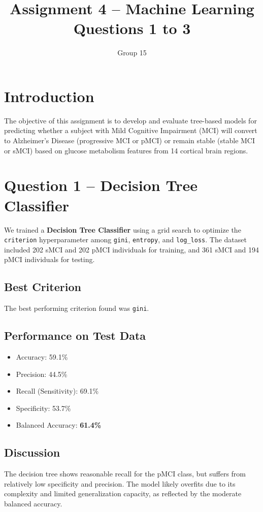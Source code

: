 \documentclass[12pt]{article}
\title{Assignment 4 – Machine Learning \\ \large Questions 1 to 3}
\author{Group 15}
\date{}
\begin{document}
\maketitle

\section*{Introduction}

The objective of this assignment is to develop and evaluate tree-based models for predicting whether a subject with Mild Cognitive Impairment (MCI) will convert to Alzheimer’s Disease (progressive MCI or pMCI) or remain stable (stable MCI or sMCI) based on glucose metabolism features from 14 cortical brain regions.

\section*{Question 1 – Decision Tree Classifier}

We trained a \textbf{Decision Tree Classifier} using a grid search to optimize the \texttt{criterion} hyperparameter among \texttt{gini}, \texttt{entropy}, and \texttt{log\_loss}. The dataset included 202 sMCI and 202 pMCI individuals for training, and 361 sMCI and 194 pMCI individuals for testing.

\subsection*{Best Criterion}
The best performing criterion found was \texttt{gini}.

\subsection*{Performance on Test Data}
\begin{itemize}
    \item Accuracy: 59.1\%
    \item Precision: 44.5\%
    \item Recall (Sensitivity): 69.1\%
    \item Specificity: 53.7\%
    \item Balanced Accuracy: \textbf{61.4\%}
\end{itemize}

\subsection*{Discussion}
The decision tree shows reasonable recall for the pMCI class, but suffers from relatively low specificity and precision. The model likely overfits due to its complexity and limited generalization capacity, as reflected by the moderate balanced accuracy.
\end{document}
